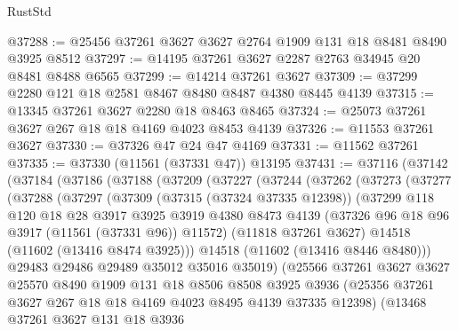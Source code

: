 \begin{lexlean}{RustStd}
\begin{coremodule}
@37288 := @25456 @37261 @3627 @3627 @2764 @1909 @131 @18 @8481 @8490 @3925 @8512
@37297 := @14195 @37261 @3627 @2287 @2763 @34945 @20 @8481 @8488 @6565
@37299 := @14214 @37261 @3627
@37309 := @37299 @2280 @121 @18 @2581 @8467 @8480 @8487 @4380 @8445 @4139
@37315 := @13345 @37261 @3627 @2280 @18 @8463 @8465
@37324 := @25073 @37261 @3627 @267 @18 @18 @4169 @4023 @8453 @4139
@37326 := @11553 @37261 @3627
@37330 := @37326 @47 @24 @47 @4169
@37331 := @11562 @37261
@37335 := @37330 (@11561 (@37331 @47)) @13195
@37431 := @37116
    (@37142
      (@37184
        (@37186
          (@37188
            (@37209
              (@37227
                (@37244
                  (@37262
                    (@37273
                      (@37277
                        (@37288
                          (@37297
                            (@37309
                              (@37315 (@37324 @37335 @12398))
                              (@37299
                                @118
                                @120
                                @18
                                @28
                                @3917
                                @3925
                                @3919
                                @4380
                                @8473
                                @4139
                                (@37326 @96 @18 @96 @3917 (@11561 (@37331 @96)) @11572)
                                (@11818 @37261 @3627)
                                @14518
                                (@11602 (@13416 @8474 @3925)))
                              @14518
                              (@11602 (@13416 @8446 @8480)))
                            @29483
                            @29486
                            @29489
                            @35012
                            @35016
                            @35019)
                          (@25566
                            @37261
                            @3627
                            @3627
                            @25570
                            @8490
                            @1909
                            @131
                            @18
                            @8506
                            @8508
                            @3925
                            @3936
                            (@25356 @37261 @3627 @267 @18 @18 @4169 @4023 @8495 @4139 @37335 @12398)
                            (@13468
                              @37261
                              @3627
                              @131
                              @18
                              @3936

\end{coremodule}
\end{lexlean}
